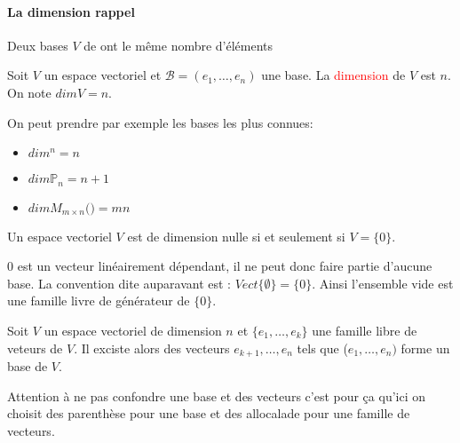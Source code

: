 \paragraph{La dimension rappel}
\begin{theoreme}
    Deux bases $V$ de ont le même nombre d'éléments
\end{theoreme}

\begin{definition}
    Soit $V$ un espace vectoriel et $\mathcal{B} = (e_1, \dots, e_n)$ une base. La \textcolor{red}{dimension} de $V$ est $n$. On note $dim V = n$.
\end{definition}
\begin{framedremark}
    On peut prendre par exemple les bases les plus connues:
    \begin{itemize}
        \item $dim $\R$^n = n$
        \item $dim \mathbb{P}_n = n + 1$
        \item $dim M_{m \times n}($\R$) = mn$
    \end{itemize}
\end{framedremark}

\begin{definition}
    Un espace vectoriel $V$ est de dimension nulle si et seulement si $V = \{0\}$.
\end{definition}
0 est un vecteur linéairement dépendant, il ne peut donc faire partie d'aucune base. La convention dite auparavant est : $Vect\{\emptyset\} = \{0\}$. Ainsi l'ensemble vide est une famille livre de générateur de $\{0\}$.

\begin{theoreme}
    Soit $V$ un espace vectoriel de dimension $n$ et $\{e_1, \dots, e_k\}$ une famille libre de veteurs de $V$. Il exciste alors des vecteurs $e_{k+1}, \dots, e_n$ tels que ($e_1, \dots, e_n)$ forme un base de $V$.
\end{theoreme}
\begin{framedremark}
    Attention à ne pas confondre une base et des vecteurs c'est pour ça qu'ici on choisit des parenthèse pour une base et des allocalade pour une famille de vecteurs.
\end{framedremark}

